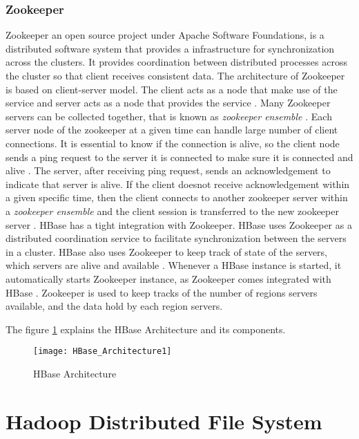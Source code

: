 \documentclass[11pt,a4paper,bibtotoc,idxtotoc,headsepline,footsepline,footexclude,BCOR12mm,DIV13]{scrbook}
\begin{document}
\subsubsection{Zookeeper}
\label{zookeeper}
Zookeeper an open source project under Apache Software Foundations, is a distributed software system that provides a infrastructure for synchronization across the clusters. It provides coordination between distributed processes across the cluster so that client receives consistent data. The architecture of Zookeeper is based on client-server model. The client acts as a node that make use of the service and server acts as a node that provides the service \cite{hbase:zookeeper}. Many Zookeeper servers can be collected together, that is known as \emph{zookeeper ensemble} \cite{hbase:zookeeper}. Each server node of the zookeeper at a given time can handle large number of client connections. It is essential to know if the connection is alive, so the client node sends a ping request to the server it is connected to make sure it is connected and alive \cite{hbase:zookeeper}. The server, after receiving ping request, sends an acknowledgement to indicate that server is alive. If the client doesnot receive acknowledgement within a given specific time, then the client connects to another zookeeper server within a \emph{zookeeper ensemble} and the client session is transferred to the new zookeeper server \cite{hbase:zookeeper}.
\newline
HBase has a tight integration with Zookeeper. HBase uses Zookeeper as a distributed coordination service to facilitate synchronization between the servers in a cluster. HBase also uses Zookeeper to keep track of state of the servers, which servers are alive and available \cite{hbase:architecture}. Whenever a HBase instance is started, it automatically starts Zookeeper instance, as Zookeeper comes integrated with HBase \cite{hbase:insights}. Zookeeper is used to keep tracks of the number of regions servers available, and the data hold by each region servers. 
\newline

The figure \ref{fig:hbasetable} explains the HBase Architecture and its components.
\begin{figure}
	\centering
	\texttt{[image: HBase\_Architecture1]}
	\caption{HBase Architecture}
	\label{fig:hbasetable}
\end{figure}

\newpage
\section{Hadoop Distributed File System}
\label{Hadoop Distributed File System}
\end{document}
